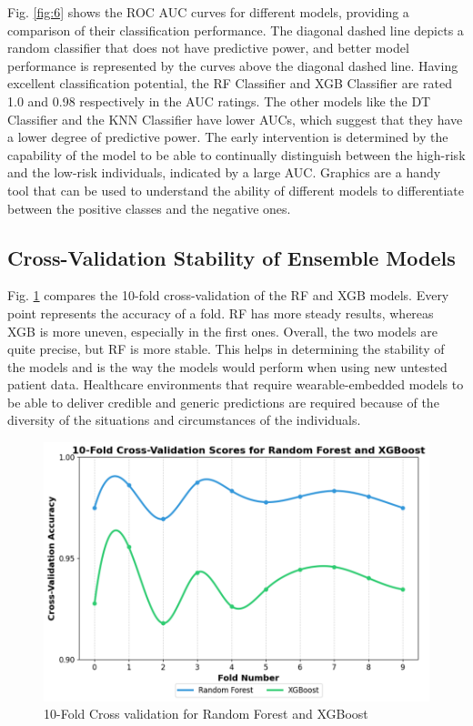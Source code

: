 \documentclass[conference]{IEEEtran}
\begin{document}
Fig. \ref{fig:6} shows the ROC AUC curves for different models, providing a comparison of their classification performance. The diagonal dashed line depicts a random classifier that does not have predictive power, and better model performance is represented by the curves above the diagonal dashed line. Having excellent classification potential, the RF Classifier and XGB Classifier are rated 1.0 and 0.98 respectively in the AUC ratings. The other models like the DT Classifier and the KNN Classifier have lower AUCs, which suggest that they have a lower degree of predictive power. The early intervention is determined by the capability of the model to be able to continually distinguish between the high-risk and the low-risk individuals, indicated by a large AUC. Graphics are a handy tool that can be used to understand the ability of different models to differentiate between the positive classes and the negative ones.


\subsection{\textbf{Cross-Validation Stability of Ensemble Models}}


Fig. \ref{fig:7} compares the 10-fold cross-validation of the RF and XGB models. Every point represents the accuracy of a fold. RF has more steady results, whereas XGB is more uneven, especially in the first ones. Overall, the two models are quite precise, but RF is more stable. This helps in determining the stability of the models and is the way the models would perform when using new untested patient data. Healthcare environments that require wearable-embedded models to be able to deliver credible and generic predictions are required because of the diversity of the situations and circumstances of the individuals.



\begin{figure}[h]
\centerline{
\includegraphics[width=0.5 \textwidth]{Picture7.png}}
\caption{10-Fold Cross validation for Random Forest and XGBoost}
\label{fig:7}
\end{figure}
\end{document}
